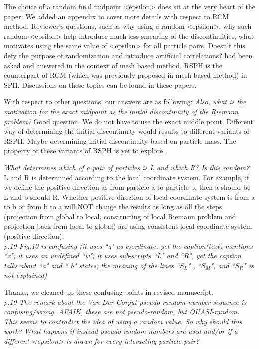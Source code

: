 \documentclass[10pt,a4paper]{article}
\begin{document}
The choice of a random final midpoint <epsilon> does sit at the very heart of the paper. We added an appendix to cover more details with respect to RCM method. Reviewer's questions, such as why using a random <epsilon>, why such random <epsilon> help introduce much less smearing of the discontinuities, what motivates using the same value of <epsilon> for all particle pairs, Doesn't this defy the purpose of randomization and introduce artificial correlations? had been asked and answered in the context of mesh based method. RSPH is the counterpart of RCM (which was previously proposed in mesh based method) in SPH. Discussions on these topics can be found in these papers. 

With respect to other questions, our answers are as following: 
\textit{Also, what is the motivation for the exact midpoint as the initial discontinuity of the Riemann problem?}
Good question. We do not have to use the exact middle point. Different way of determining the initial discontinuity would results to different variants of RSPH. Maybe determining initial discontinuity based on particle mass. The property of these variants of RSPH is yet to explore. 

\textit{ What determines which of a pair of particles is L and which R? Is this random? }
L and R is determined according to the local coordinate system. For example, if we define the positive direction as from particle a to particle b, then a should be L and b should R. Whether positive direction of local coordinate system is from a to b or from b to a will NOT change the results as long as all the steps (projection from global to local, constructing of local Riemann problem and projection back from local to global) are using consistent local coordinate system (positive direction).
\\[3pt]


\textit{p.10 Fig.10 is confusing (it uses ``q" as coordinate, yet the caption(text) mentions ``x"; it uses an undefined ``w"; it uses sub-scripts ``L" and ``R", yet the caption talks about ``a" and `` b" states; the meaning of the lines ``$S_L$" , ``$S_M$", and ``$S_R$" is not explained)}

Thanks, we cleaned up these confusing points in revised manuscript.
\\[3pt]

\textit{p.10 The remark about the Van Der Corput pseudo-random number sequence is confusing/wrong. AFAIK, these are not pseudo-random, but QUASI-random. This seems to contradict the idea of using a random value. So why should this work?
What happens if instead pseudo-random numbers are used and/or if a different <epsilon> is drawn for every interacting particle pair?}
\end{document}
